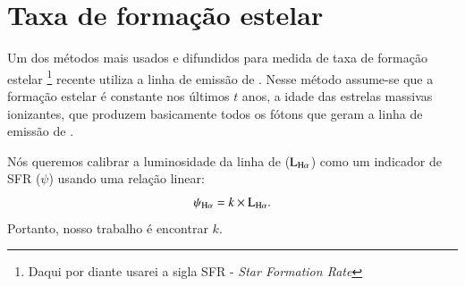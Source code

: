 \section{Taxa de formação estelar}
\label{sec:emlines:SFR}

Um dos métodos mais usados e difundidos para medida de taxa de formação estelar \footnote{Daqui por
diante usarei a sigla SFR - {\em Star Formation Rate}} recente utiliza a linha de emissão de
\Halpha. Nesse método assume-se que a formação estelar é constante nos últimos $t$ anos, a idade das
estrelas massivas ionizantes, que produzem basicamente todos os fótons que geram a linha de emissão
de \Halpha.

Nós queremos calibrar a luminosidade da linha de \Halpha ($\mathrm{L}_{\Halpha}$) como um indicador
de SFR ($\psi$) \citep[e.g., ][]{Kennicutt.1998a} usando uma relação linear:
\begin{equation}
	\psi_{\Halpha} = k \times \mathrm{L}_{\Halpha}.
	\label{eq:SFRHa}
\end{equation}
\noindent Portanto, nosso trabalho é encontrar $k$.


